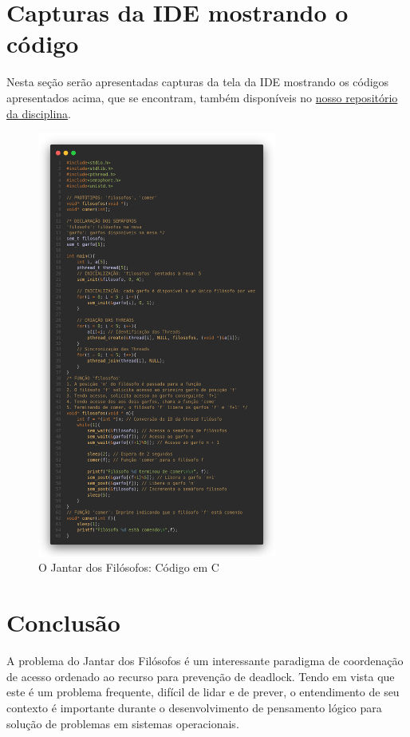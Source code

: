 \documentclass[
	12pt,				%
	openright,			%
	oneside,			%
	a4paper,			%
	chapter=TITLE,		%
	english,			%
	french,				%
	spanish,			%
	brazil				%
	]{abntex2}
\theoremstyle{definition}
\begin{document}
\section{Capturas da IDE mostrando o código}
Nesta seção serão apresentadas capturas da tela da IDE mostrando os códigos apresentados acima, que se encontram, também disponíveis no
\href{https://github.com/jvictorferreira3301/Sistemas_Operacionais}{nosso repositório da disciplina}.
\begin{figure}[h]
    \centering
    \includegraphics[width=0.7\textwidth]{imagens/jantar_filosofos.png}
    \caption{O Jantar dos Filósofos: Código em C}
    \label{fig:jantar_filosofos}
\end{figure}
\clearpage
\section{Conclusão}

A problema do Jantar dos Filósofos é um interessante paradigma de coordenação de acesso ordenado ao recurso para prevenção de deadlock. Tendo em vista que este é um problema frequente, difícil de lidar e de prever, o entendimento de seu contexto é importante durante o desenvolvimento de pensamento lógico para solução de problemas em sistemas operacionais.
\end{document}
